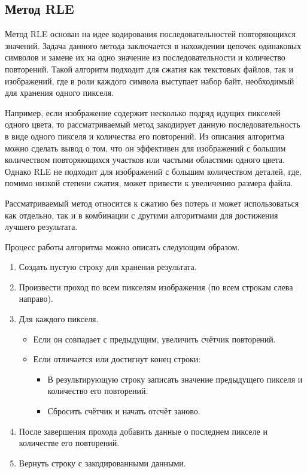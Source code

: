 \subsection{Метод RLE}

Метод RLE основан на идее кодирования последовательностей повторяющихся значений. Задача данного метода заключается в нахождении цепочек одинаковых символов и замене их на одно значение из последовательности и количество повторений. Такой алгоритм подходит для сжатия как текстовых файлов, так и изображений, где в роли каждого символа выступает набор байт, необходимый для хранения одного пикселя.

Например, если изображение содержит несколько подряд идущих пикселей одного цвета, то рассматриваемый метод закодирует данную последовательность в виде одного пикселя и количества его повторений. Из описания алгоритма можно сделать вывод о том, что он эффективен для изображений с большим количеством повторяющихся участков или частыми областями одного цвета. Однако RLE не подходит для изображений с большим количеством деталей, где, помимо низкой степени сжатия, может привести к увеличению размера файла.

Рассматриваемый метод относится к сжатию без потерь и может использоваться как отдельно, так и в комбинации с другими алгоритмами для достижения лучшего результата.

Процесс работы алгоритма можно описать следующим образом.
\begin{enumerate}
    \item Создать пустую строку для хранения результата.
    \item Произвести проход по всем пикселям изображения (по всем строкам слева направо).
    \item Для каждого пикселя.
    \begin{itemize}
        \item Если он совпадает с предыдущим, увеличить счётчик повторений.
        \item Если отличается или достигнут конец строки:
        \begin{itemize}
            \item В результирующую строку записать значение предыдущего пикселя и количество его повторений.
            \item Сбросить счётчик и начать отсчёт заново.
        \end{itemize}
    \end{itemize}
    \item После завершения прохода добавить данные о последнем пикселе и количестве его повторений.
    \item Вернуть строку с закодированными данными.
\end{enumerate}

